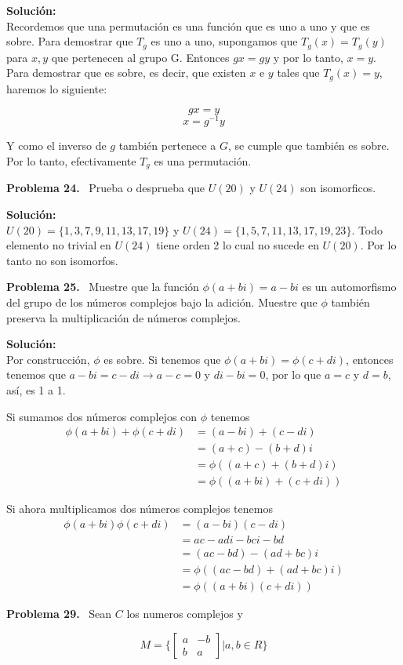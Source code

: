 \documentclass{article}
\newcounter{problem}
\newcounter{solution}
\newcommand\Problem[1]{%
  \stepcounter{problem}%
  \textbf{Problema #1.}~%
  \setcounter{solution}{0}%
}
\newcommand\TheSolution{%
  \textbf{Solución:}\\%
}
\begin{document}
\TheSolution{}
Recordemos que una permutación es una función que es uno a uno y que es sobre.
Para demostrar que $T_{g}$ es uno a uno, supongamos que $T_{g}(x) = T_{g}(y)$
para $x,y$ que pertenecen al grupo G. Entonces $gx=gy$ y por lo tanto, $x=y$.
Para demostrar que es sobre, es decir, que existen $x$ e $y$ tales que
$T_{g}(x)=y$, haremos lo siguiente:

$$gx=y$$
$$x=g^{-1}y$$

Y como el inverso de $g$ también pertenece a $G$, se cumple que también es
sobre. Por lo tanto, efectivamente $T_{g}$ es una permutación.

\Problem{24} Prueba o desprueba que $U(20)$ y $U(24)$ son isomorficos.

\TheSolution{}
$U(20) = \{1,3,7,9,11,13,17,19\}$ y $U(24) = \{1,5,7,11,13,17,19,23\}$. Todo
elemento no trivial en $U(24)$ tiene orden 2 lo cual no sucede en $U(20)$. Por
lo tanto no son isomorfos.

\Problem{25} Muestre que la función $\phi (a+bi) = a -bi$ es un automorfismo
del grupo de los números complejos bajo la adición. Muestre que $\phi$ también
preserva la multiplicación de números complejos.

\TheSolution{}
Por construcción, $\phi$ es sobre. Si tenemos que $\phi(a+bi) = \phi(c+di)$,
entonces tenemos que $a-bi = c-di \rightarrow a-c = 0$ y $di - bi = 0$, por lo
que $a = c$ y $d = b$, así, es 1 a 1.

Si sumamos dos números complejos con $\phi$ tenemos
\begin{align*}
\phi(a+bi) + \phi(c+di) &= (a-bi) + (c-di) \\
&= (a+c) - (b+d)i \\
&= \phi((a+c) + (b+d)i) \\
&= \phi((a+bi)+(c+di))
\end{align*}

Si ahora multiplicamos dos números complejos tenemos
\begin{align*}
\phi(a+bi)\phi(c+di) &= (a-bi)(c-di) \\
&= ac - adi - bci - bd \\
&= (ac-bd) - (ad + bc)i \\
&= \phi((ac-bd) + (ad + bc)i) \\
&= \phi((a+bi)(c+di))
\end{align*}

\Problem{29} Sean $C$ los numeros complejos y

\[
  M = \Bigg\{
\begin{bmatrix}
  a & -b \\
  b & a
\end{bmatrix}
\Big| a, b \in R
\Bigg\}
\]
\end{document}
